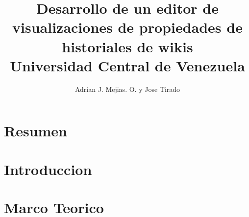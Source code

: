 \documentclass[12pt]{report}
\title{
	{Desarrollo de un editor de visualizaciones de propiedades de historiales de wikis}\\
	{\large Universidad Central de Venezuela}\\
}
\author{Adrian J. Mejias. O. y Jose Tirado}
\begin{document}


\chapter*{Resumen}


\tableofcontents

\listoffigures

\chapter{Introduccion}


\chapter{Marco Teorico}


% 

% 

% 

\printbibliography
\end{document}
